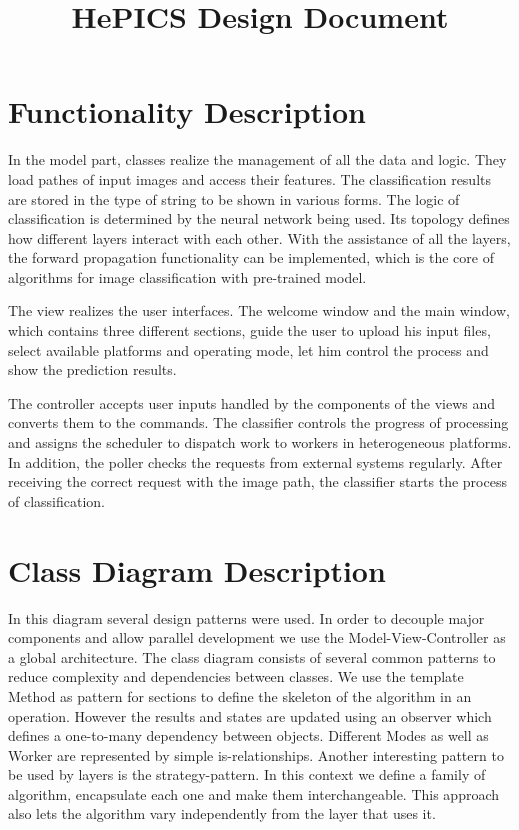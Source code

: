 \documentclass[parskip=full]{scrartcl}
\title{HePICS Design Document}
\begin{document}
\maketitle
\thispagestyle{empty}
\pagebreak





\tableofcontents
\pagebreak





\section {Functionality Description}

In the model part, classes realize the management of all the data and logic. They load pathes of input images and access their features. The classification results are stored in the type of string to be shown in various forms. The logic of classification is determined by the neural network being used. Its topology defines how different layers interact with each other. With the assistance of all the layers, the forward propagation functionality can be implemented, which is the core of algorithms for image classification with pre-trained model.

The view realizes the user interfaces. The welcome window and the main window, which contains three different sections, guide the user to upload his input files, select available platforms and operating mode, let him control the process and show the prediction results. 

The controller accepts user inputs handled by the components of the views and converts them to the commands. The classifier controls the progress of processing and assigns the scheduler to dispatch work to workers in heterogeneous platforms. In addition, the poller checks the requests from external systems regularly. After receiving the correct request with the image path, the classifier starts the process of classification.



\section {Class Diagram Description}

In this diagram several design patterns were used.
In order to decouple  major components and allow parallel development we use the Model-View-Controller as a global architecture.
The class diagram consists of several common patterns to reduce complexity and dependencies between classes.
We use the template Method as pattern for sections to define the skeleton of the algorithm in an operation.
However the results and states are updated using an observer which defines a one-to-many dependency between objects.
Different Modes as well as Worker are represented by simple is-relationships.
Another interesting pattern to be used by layers is the strategy-pattern. In this context we define a family of algorithm, encapsulate
each one and make them interchangeable. This approach also lets the algorithm vary independently from the layer that uses it.
\end{document}
